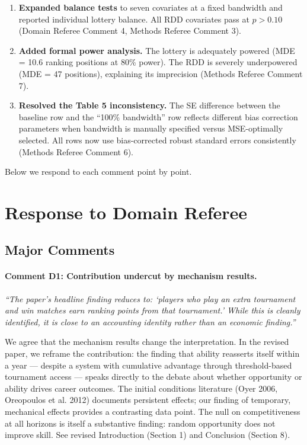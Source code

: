 \documentclass[12pt]{article}
\newcommand{\resp}[1]{\textcolor{response}{#1}}
\begin{document}
\begin{enumerate}
\item \textbf{Expanded balance tests} to seven covariates at a fixed bandwidth and reported individual lottery balance. All RDD covariates pass at $p > 0.10$ (Domain Referee Comment 4, Methods Referee Comment 3).

\item \textbf{Added formal power analysis.} The lottery is adequately powered (MDE = 10.6 ranking positions at 80\% power). The RDD is severely underpowered (MDE = 47 positions), explaining its imprecision (Methods Referee Comment 7).

\item \textbf{Resolved the Table 5 inconsistency.} The SE difference between the baseline row and the ``100\% bandwidth'' row reflects different bias correction parameters when bandwidth is manually specified versus MSE-optimally selected. All rows now use bias-corrected robust standard errors consistently (Methods Referee Comment 6).
\end{enumerate}

\noindent Below we respond to each comment point by point.

\newpage

\section*{Response to Domain Referee}

\subsection*{Major Comments}

\paragraph{Comment D1: Contribution undercut by mechanism results.}
\textit{``The paper's headline finding reduces to: `players who play an extra tournament and win matches earn ranking points from that tournament.' While this is cleanly identified, it is close to an accounting identity rather than an economic finding.''}

\resp{We agree that the mechanism results change the interpretation. In the revised paper, we reframe the contribution: the finding that ability reasserts itself within a year --- despite a system with cumulative advantage through threshold-based tournament access --- speaks directly to the debate about whether opportunity or ability drives career outcomes. The initial conditions literature (Oyer 2006, Oreopoulos et al. 2012) documents persistent effects; our finding of temporary, mechanical effects provides a contrasting data point. The null on competitiveness at all horizons is itself a substantive finding: random opportunity does not improve skill. See revised Introduction (Section 1) and Conclusion (Section 8).}
\end{document}
